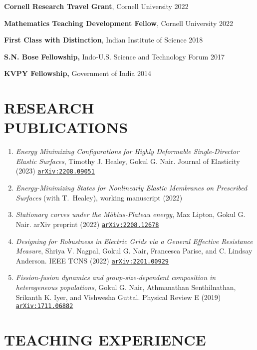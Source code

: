 \documentclass[margin]{res} %
\begin{document}
\begin{resume}
{\bf Cornell Research Travel Grant}, Cornell University \hfill2022

{\bf Mathematics Teaching Development Fellow}, Cornell University \hfill2022

{\bf First Class with Distinction}, Indian Institute of Science \hfill2018

{\bf S.N. Bose Fellowship,} Indo-U.S. Science and Technology Forum \hfill2017

{\bf KVPY Fellowship,} Government of India \hfill2014

\section{RESEARCH\\PUBLICATIONS}
\begin{enumerate}
	\item {\sl Energy Minimizing Configurations for Highly Deformable Single-Director Elastic Surfaces}, Timothy J. Healey, Gokul G. Nair. Journal of Elasticity (2023) \href{https://arxiv.org/abs/2208.09051}{\texttt{arXiv:2208.09051}}

	\item {\sl Energy-Minimizing States for Nonlinearly Elastic Membranes on Prescribed Surfaces} (with T.~Healey), working manuscript (2022)
	
	\item {\sl Stationary curves under the M\"obius-Plateau energy}, Max Lipton, Gokul G. Nair. arXiv preprint (2022) \href{https://arxiv.org/abs/2208.12678}{\texttt{arXiv:2208.12678}} 
	 	
	\item {\sl Designing for Robustness in Electric Grids via a General Effective Resistance Measure}, Shriya V. Nagpal, Gokul G. Nair, Francesca Parise, and C. Lindsay Anderson. IEEE TCNS (2022) \href{https://arxiv.org/abs/2201.00929}{\texttt{arXiv:2201.00929}}
	
	\item {\sl Fission-fusion dynamics and group-size-dependent composition in heterogeneous populations}, Gokul G. Nair, Athmanathan Senthilnathan, Srikanth K. Iyer, and Vishwesha Guttal. Physical Review E (2019) \href{https://arxiv.org/abs/1711.06882}{\texttt{arXiv:1711.06882}}
\end{enumerate}

\section{TEACHING EXPERIENCE}


\end{resume}
\end{document}

